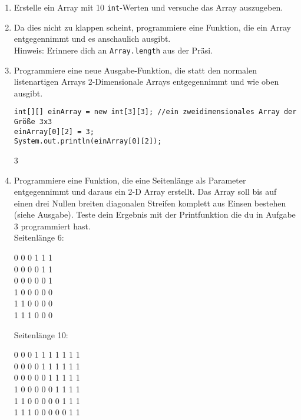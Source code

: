 \documentclass{../../sheet}
\begin{document}
\begin{enumerate}
    \item Erstelle ein Array mit 10 \texttt{int}-Werten und versuche das Array auszugeben.
    \item Da dies nicht zu klappen scheint, programmiere eine Funktion, die ein Array entgegennimmt und es anschaulich ausgibt.\\
          Hinweis: Erinnere dich an \texttt{Array.length} aus der Präsi.
    \item Programmiere eine neue Ausgabe-Funktion, die statt den normalen listenartigen Arrays 2-Dimensionale Arrays entgegennimmt und wie oben ausgibt.\\
          \begin{verbatim}
int[][] einArray = new int[3][3]; //ein zweidimensionales Array der Größe 3x3
einArray[0][2] = 3;
System.out.println(einArray[0][2]);
    \end{verbatim}
          \begin{ausgabe}
              3
          \end{ausgabe}
    \item Programmiere eine Funktion, die eine Seitenlänge als Parameter entgegennimmt und daraus ein 2-D Array erstellt. Das Array soll bis auf einen drei Nullen breiten diagonalen Streifen komplett aus Einsen bestehen (siehe Ausgabe). Teste dein Ergebnis mit der Printfunktion die du in Aufgabe 3 programmiert hast.\\
          Seitenlänge 6:
          \begin{ausgabe}
              0 0 0 1 1 1\\
              0 0 0 0 1 1\\
              0 0 0 0 0 1\\
              1 0 0 0 0 0\\
              1 1 0 0 0 0\\
              1 1 1 0 0 0
          \end{ausgabe}
          Seitenlänge 10:
          \begin{ausgabe}
              0 0 0 1 1 1 1 1 1 1 \\
              0 0 0 0 1 1 1 1 1 1 \\
              0 0 0 0 0 1 1 1 1 1 \\
              1 0 0 0 0 0 1 1 1 1 \\
              1 1 0 0 0 0 0 1 1 1 \\
              1 1 1 0 0 0 0 0 1 1 \\

\end{ausgabe}
\end{enumerate}
\end{document}
